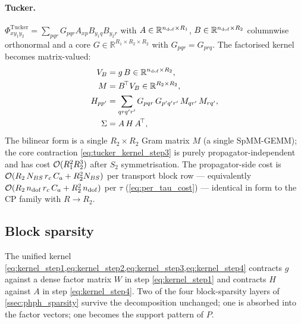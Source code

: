 \paragraph{Tucker.}
$\Phi_{xy_1y_2}^{\mathrm{Tucker}}=\sum_{pqr}G_{pqr}A_{xp}B_{y_1 q}B_{y_2 r}$
with $A\in\mathbb{R}^{n_{\mathrm{dof}}\times R_1}$, $B\in\mathbb{R}^{n_{\mathrm{dof}}\times R_2}$
columnwise orthonormal and a core $G\in\mathbb{R}^{R_1\times R_2\times R_2}$
with $G_{pqr}=G_{prq}$. The factorised kernel becomes matrix-valued:
\begin{align}
  \label{eq:tucker_kernel_step1}
  V_B    &= g\,B \in\mathbb{R}^{n_{\mathrm{dof}}\times R_2},\\
  \label{eq:tucker_kernel_step2}
  M      &= B^{\!\top} V_B \in\mathbb{R}^{R_2\times R_2},\\
  \label{eq:tucker_kernel_step3}
  H_{pp'} &= \sum_{q r q' r'} G_{p q r}\,G_{p' q' r'}\,M_{q r'}\,M_{r q'},\\
  \label{eq:tucker_kernel_step4}
  \Sigma &= A\,H\,A^{\!\top},
\end{align}
The bilinear form is a single $R_2\times R_2$ Gram matrix $M$ (a
single SpMM-GEMM); the core contraction
\cref{eq:tucker_kernel_step3} is purely propagator-independent and
has cost $\mathcal{O}(R_1^{2}R_2^{3})$ after $S_2$ symmetrisation. The
propagator-side cost is $\mathcal{O}(R_2\,N_{BS}\,r_c\,C_a + R_2^{2}N_{BS})$ per
transport block row --- equivalently
$\mathcal{O}(R_2\,n_{\mathrm{dof}}\,r_c\,C_a + R_2^{2}\,n_{\mathrm{dof}})$ per $\tau$
(\cref{eq:per_tau_cost}) --- identical in form to the CP family with
$R\to R_2$.

\subsection{Block sparsity}
\label{ssec:phph_decomp_blocks}

The unified kernel
\cref{eq:kernel_step1,eq:kernel_step2,eq:kernel_step3,eq:kernel_step4}
contracts $g$ against a dense factor matrix $W$ in step
\cref{eq:kernel_step1} and contracts $H$ against $A$ in step
\cref{eq:kernel_step4}. Two of the four block-sparsity layers of
\cref{ssec:phph_sparsity} survive the decomposition unchanged; one is
absorbed into the factor vectors; one becomes the support pattern of
$P$.

